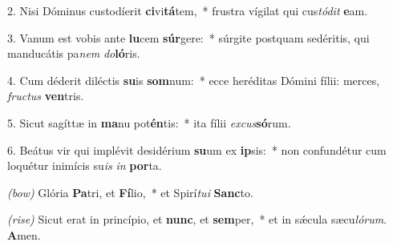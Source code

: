 2. Nisi Dóminus custodíerit \textbf{ci}vi\textbf{tá}\-tem,~* frustra vígilat qui cus\textit{tó}\textit{dit} \textbf{e}am.

3. Vanum est vobis ante \textbf{lu}cem \textbf{súr}gere:~* súrgite postquam sedéritis, qui manducátis pa\textit{nem} \textit{do}\textbf{ló}ris.

4. Cum déderit diléctis \textbf{su}is \textbf{som}\-num:~* ecce heréditas Dómini fílii: merces, \textit{fruc}\textit{tus} \textbf{ven}tris.

5. Sicut sagíttæ in \textbf{ma}nu pot\textbf{én}tis:~* ita fílii \textit{ex}\textit{cus}\textbf{só}rum.

6. Beátus vir qui implévit desidérium \textbf{su}um ex \textbf{ip}sis:~* non confundétur cum loquétur inimícis su\textit{is} \textit{in} \textbf{por}ta.

\textit{(bow)} Glória \textbf{Pa}tri, et \textbf{Fí}lio,~* et Spirí\textit{tu}\textit{i} \textbf{Sanc}to.

\textit{(rise)}  Sicut erat in princípio, et \textbf{nunc}, et \textbf{sem}per,~* et in s\'{\ae}cula sæcu\textit{ló}\textit{rum}. \textbf{A}men.